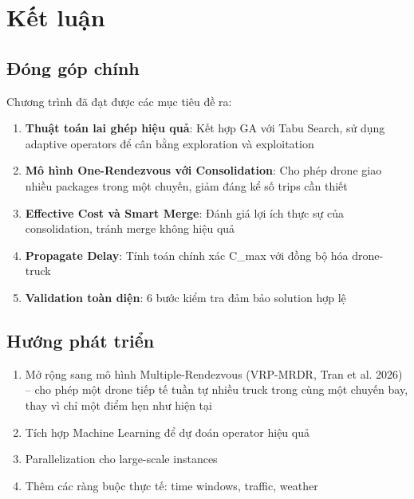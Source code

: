 \documentclass[12pt,a4paper]{article}
\begin{document}
\section{Kết luận}

\subsection{Đóng góp chính}

Chương trình đã đạt được các mục tiêu đề ra:

\begin{enumerate}
    \item \textbf{Thuật toán lai ghép hiệu quả}: Kết hợp GA với Tabu Search, sử dụng adaptive operators để cân bằng exploration và exploitation
    
    \item \textbf{Mô hình One-Rendezvous với Consolidation}: Cho phép drone giao nhiều packages trong một chuyến, giảm đáng kể số trips cần thiết
    
    \item \textbf{Effective Cost và Smart Merge}: Đánh giá lợi ích thực sự của consolidation, tránh merge không hiệu quả
    
    \item \textbf{Propagate Delay}: Tính toán chính xác C\_max với đồng bộ hóa drone-truck
    
    \item \textbf{Validation toàn diện}: 6 bước kiểm tra đảm bảo solution hợp lệ
\end{enumerate}

\subsection{Hướng phát triển}
\label{sec:future-work}

\begin{enumerate}
    \item Mở rộng sang mô hình Multiple-Rendezvous (VRP-MRDR, Tran et al. 2026) -- cho
    phép một drone tiếp tế tuần tự nhiều truck trong cùng một chuyến bay, thay vì chỉ
    một điểm hẹn như hiện tại
    \item Tích hợp Machine Learning để dự đoán operator hiệu quả
    \item Parallelization cho large-scale instances
    \item Thêm các ràng buộc thực tế: time windows, traffic, weather
\end{enumerate}
\end{document}
